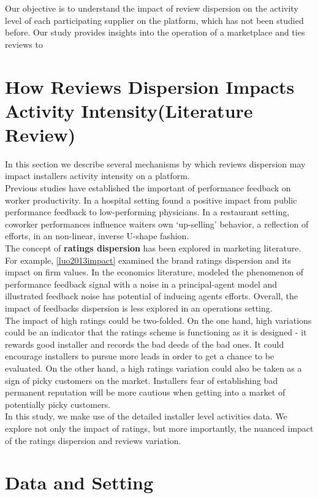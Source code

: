 \documentclass[msom,blindrev]{informs3}
\begin{document}
Our objective is to understand the impact of review dispersion on the activity level of each participating supplier on the platform, which has not been studied before. Our study provides insights into the operation of a marketplace and ties reviews to



\section{How Reviews Dispersion Impacts Activity Intensity(Literature Review) }
 In this section we describe several mechanisms by which reviews dispersion may impact installers activity intensity on a platform. \\
 Previous studies have established the important of performance feedback on worker productivity. In a hospital setting \cite{song2017closing} found a positive impact from public performance feedback to low-performing physicians. In a restaurant setting, coworker performances influence waiters own `up-selling' behavior, a reflection of efforts, in an non-linear, inverse U-shape fashion. \\ 
The concept of \textbf{ratings dispersion} has been explored in marketing literature. For example, \ref{luo2013impact} examined the brand ratings dispersion and its impact on firm values. In the economics literature, \cite{marinovic2015credibility} modeled the phenomenon of performance feedback signal with a noise in a principal-agent model and illustrated feedback noise has potential of inducing agents efforts. Overall, the impact of feedbacks dispersion is less explored in an operations setting. \\
The impact of high ratings could be two-folded. On the one hand, high variations could be an indicator that the ratings scheme is functioning as it is designed - it rewards good installer and records the bad deeds of the bad ones. It could encourage installers to pursue more leads in order to get a chance to be evaluated. 
On the other hand, a high ratings variation could also be taken as a sign of picky customers on the market. Installers fear of establishing bad permanent reputation will be more cautious when getting into a market of potentially picky customers. \\ 
In this study, we make use of the detailed installer level activities data. We explore not only the impact of ratings, but more importantly, the nuanced impact of the ratings dispersion and reviews variation. 


\section{Data and Setting}
\end{document}
